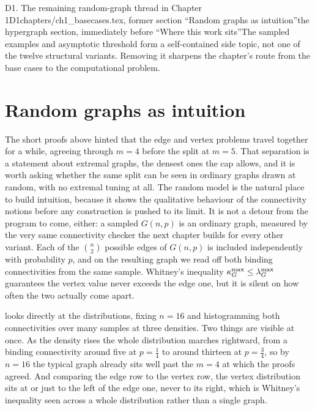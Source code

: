 \begin{offcut}{D1. The remaining random-graph thread in Chapter 1}{D1}{chapters/ch1\_basecases.tex, former section ``Random graphs as intuition''}{the hypergraph section, immediately before ``Where this work sits''}{The sampled examples and asymptotic threshold form a self-contained side topic, not one of the twelve structural variants. Removing it sharpens the chapter's route from the base cases to the computational problem.}
\section{Random graphs as intuition}

The short proofs above hinted that the edge and vertex problems travel together for a while, agreeing through $m = 4$ before the split at $m = 5$. That separation is a statement about extremal graphs, the densest ones the cap allows, and it is worth asking whether the same split can be seen in ordinary graphs drawn at random, with no extremal tuning at all. The random model is the natural place to build intuition, because it shows the qualitative behaviour of the connectivity notions before any construction is pushed to its limit. It is not a detour from the program to come, either: a sampled $G(n,p)$ is an ordinary graph, measured by the very same connectivity checker the next chapter builds for every other variant. Each of the $\binom{n}{2}$ possible edges of $G(n,p)$ is included independently with probability $p$, and on the resulting graph we read off both binding connectivities from the same sample. Whitney's inequality $\kappa_G^{\max} \le \lambda_G^{\max}$ guarantees the vertex value never exceeds the edge one, but it is silent on how often the two actually come apart.

 looks directly at the distributions, fixing $n = 16$ and histogramming both connectivities over many samples at three densities. Two things are visible at once. As the density rises the whole distribution marches rightward, from a binding connectivity around five at $p = \tfrac14$ to around thirteen at $p = \tfrac34$, so by $n = 16$ the typical graph already sits well past the $m = 4$ at which the proofs agreed. And comparing the edge row to the vertex row, the vertex distribution sits at or just to the left of the edge one, never to its right, which is Whitney's inequality seen across a whole distribution rather than a single graph.


\end{offcut}

